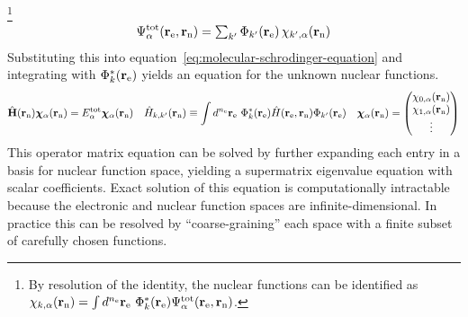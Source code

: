 \documentclass[11pt]{article}
\begin{document}
\begin{rmk}
\footnote{
  By resolution of the identity, the nuclear functions can be identified as
$
  \chi _{k,\alpha }(\mathbf{r}_{\mathrm{n}})
=
  \int
  d^{n_{\mathrm{e}}}\mathbf{r}_{\mathrm{e}}\,\,
  \Phi _k^*(\mathbf{r}_{\mathrm{e}})
  \Psi _{\alpha }^{\mathrm{tot}}(\mathbf{r}_{\mathrm{e}}, \mathbf{r}_{\mathrm{n}})
$.
}
\begin{align}
\label{eq:general-wavefunction-expansion}
  \Psi _{\alpha }^{\mathrm{tot}}(\mathbf{r}_{\mathrm{e}}, \mathbf{r}_{\mathrm{n}})
=
{\textstyle
  \sum_{k'}
  \Phi _{k'}(\mathbf{r}_{\mathrm{e}})\,
  \chi _{k',\alpha }(\mathbf{r}_{\mathrm{n}})
}
\end{align}
Substituting this into equation~\ref{eq:molecular-schrodinger-equation} and integrating with $\Phi _k^*(\mathbf{r}_{\mathrm{e}})$ yields an equation for the unknown nuclear functions.
\begin{align}
\label{eq:general-nuclear-schrodinger-equation}
  \op{\bo{H}}(\bo{r}_\mr{n})
  \bm{\x}_\a(\bo{r}_\mr{n})
=
  E_\a^\mr{tot}
  \bm{\x}_\a(\bo{r}_\mr{n})
&&
  \op{H}_{k,k'}(\bo{r}_\mr{n})
\equiv
  \int
  d^{n_\mr{e}}\bo{r}_\mr{e}\,\,
  \F_k^*(\bo{r}_\mr{e})
  \op{H}(\bo{r}_\mr{e},\bo{r}_\mr{n})
  \F_{k'}(\bo{r}_\mr{e})
&&
  \bm{\x}_\a(\bo{r}_\mr{n})
=
\ma{
  \x_{0,\a}(\bo{r}_\mr{n})\\
  \x_{1,\a}(\bo{r}_\mr{n})\\
  \vdots
}
\end{align}
This operator matrix equation can be solved by further expanding each entry in a basis for nuclear function space, yielding a supermatrix eigenvalue equation with scalar coefficients.
Exact solution of this equation is computationally intractable because the electronic and nuclear function spaces are infinite-dimensional.
In practice this can be resolved by ``coarse-graining'' each space with a finite subset of carefully chosen functions.
\end{rmk}
\end{document}
